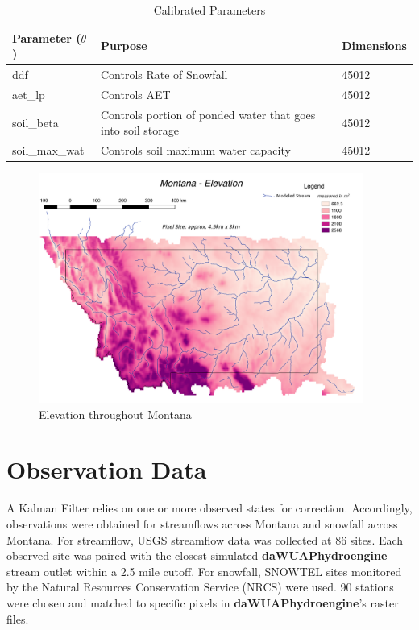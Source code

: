 \begin{table}[]
\caption{Calibrated Parameters} 
\begin{tabular}{lll}
Parameter ($\theta$) & Purpose                                                    & Dimensions  \\ \hline
ddf                  & Controls Rate of Snowfall                                        & 45012 \\
aet\_lp              & Controls AET                                                      & 45012 \\
soil\_beta           & Controls portion of ponded water that goes into soil storage & 45012 \\
soil\_max\_wat       & Controls soil maximum water capacity & 45012
\end{tabular}
\label{tab:t_params}
\end{table}

\begin{figure}[h]
    \centering
    \includegraphics[width=0.95\textwidth]{elevation}
    \caption{Elevation throughout Montana}
    \label{fig:elevation}
\end{figure}

\section{Observation Data}

A Kalman Filter relies on one or more observed states for correction. Accordingly, observations were obtained for streamflows across Montana and snowfall across Montana. For streamflow, USGS streamflow data was collected at 86 sites. Each observed site was paired with the closest simulated \textbf{daWUAPhydroengine} stream outlet within a 2.5 mile cutoff. For snowfall, SNOWTEL sites monitored by the Natural Resources Conservation Service (NRCS) were used. 90 stations were chosen and matched to specific pixels in \textbf{daWUAPhydroengine}'s raster files.


